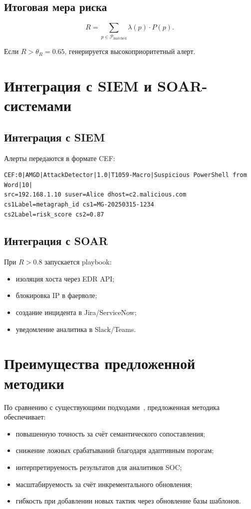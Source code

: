\subsection{Итоговая мера риска}

\begin{equation}
R = \sum_{p \in \mathcal{P}_{\text{matched}}} \lambda(p) \cdot P(p).
\label{eq:risk_score}
\end{equation}

Если $R > \theta_R = 0.65$, генерируется высокоприоритетный алерт.

\section{Интеграция с SIEM и SOAR-системами}

\subsection{Интеграция с SIEM}

Алерты передаются в формате CEF:
\begin{verbatim}
CEF:0|AMGD|AttackDetector|1.0|T1059-Macro|Suspicious PowerShell from Word|10|
src=192.168.1.10 suser=Alice dhost=c2.malicious.com 
cs1Label=metagraph_id cs1=MG-20250315-1234 
cs2Label=risk_score cs2=0.87
\end{verbatim}

\subsection{Интеграция с SOAR}

При $R > 0.8$ запускается playbook:
\begin{itemize} 
    \item изоляция хоста через EDR API;
    \item блокировка IP в фаерволе;
    \item создание инцидента в Jira/ServiceNow;
    \item уведомление аналитика в Slack/Teams.
\end{itemize}   
\section{Преимущества предложенной методики}

По сравнению с существующими подходами~\cite{Gorbachev2018,Latypov2020}, предложенная методика обеспечивает:
\begin{itemize}
    \item повышенную точность за счёт семантического сопоставления;
    \item снижение ложных срабатываний благодаря адаптивным порогам;
    \item интерпретируемость результатов для аналитиков SOC;
    \item масштабируемость за счёт инкрементального обновления;
    \item гибкость при добавлении новых тактик через обновление базы шаблонов.
\end{itemize}   